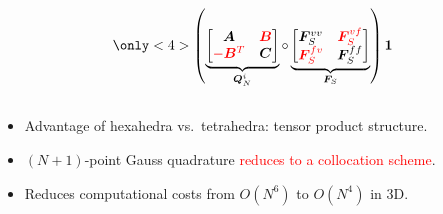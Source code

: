 \documentclass[compress]{beamer}
\theoremstyle{plain}
\newcommand{\LRp}[1]{\left( #1 \right)}
\renewcommand{\note}[1]{\textcolor{red}{{#1}}}
\begin{document}
{\begin{columns}
\begin{column}{.51\textwidth}
\[{}
\only<4>{
\LRp{\underbrace{\begin{bmatrix}
\bm{A} & \note{\bm{B}}\\
\note{-\bm{B}^T} & \bm{C}
\end{bmatrix}}_{\bm{Q}_N^i} \circ
\underbrace{\begin{bmatrix}
\bm{F}^{vv}_S & \note{\bm{F}^{vf}_S}\\
\note{\bm{F}^{fv}_S} & \bm{F}^{ff}_S
\end{bmatrix}}_{\bm{F}_S} } \bm{1}
}
\]
\end{column}
\end{columns}
\vspace{.5em}
\begin{itemize}
\item Advantage of hexahedra vs.\ tetrahedra: tensor product structure.
\vspace{.5em}
\item $(N+1)$-point Gauss quadrature \note{reduces to a collocation scheme}.  
\vspace{.5em}
\item Reduces computational costs from $O(N^6)$ to $O(N^4)$ in 3D.
\vspace{.5em}
\end{itemize} 
}
\end{document}
